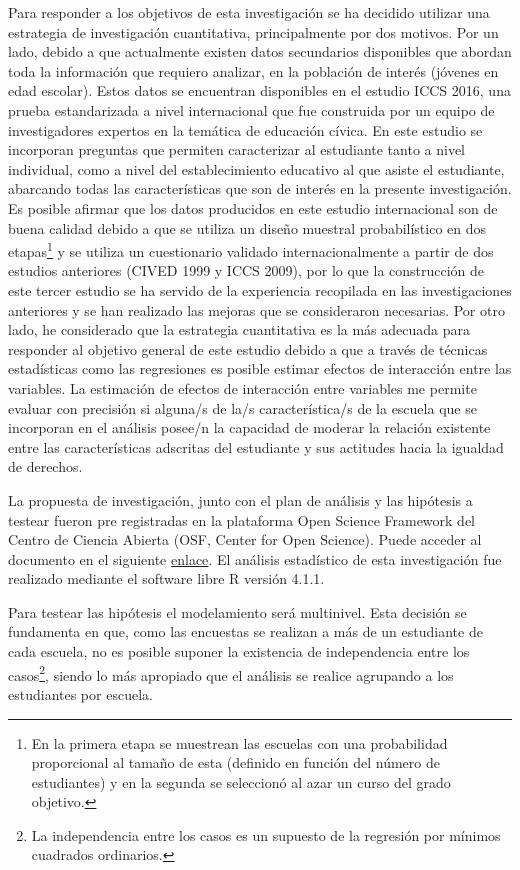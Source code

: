 \documentclass[12pt,twoside]{templates/facsothesis}
\begin{document}
Para responder a los objetivos de esta investigación se ha decidido utilizar una estrategia de investigación cuantitativa, principalmente por dos motivos. Por un lado, debido a que actualmente existen datos secundarios disponibles que abordan toda la información que requiero analizar, en la población de interés (jóvenes en edad escolar). Estos datos se encuentran disponibles en el estudio ICCS 2016, una prueba estandarizada a nivel internacional que fue construida por un equipo de investigadores expertos en la temática de educación cívica. En este estudio se incorporan preguntas que permiten caracterizar al estudiante tanto a nivel individual, como a nivel del establecimiento educativo al que asiste el estudiante, abarcando todas las características que son de interés en la presente investigación. Es posible afirmar que los datos producidos en este estudio internacional son de buena calidad debido a que se utiliza un diseño muestral probabilístico en dos etapas\footnote{En la primera etapa se muestrean las escuelas con una probabilidad proporcional al tamaño de esta (definido en función del número de estudiantes) y en la segunda se seleccionó al azar un curso del grado objetivo.} y se utiliza un cuestionario validado internacionalmente a partir de dos estudios anteriores (CIVED 1999 y ICCS 2009), por lo que la construcción de este tercer estudio se ha servido de la experiencia recopilada en las investigaciones anteriores y se han realizado las mejoras que se consideraron necesarias. Por otro lado, he considerado que la estrategia cuantitativa es la más adecuada para responder al objetivo general de este estudio debido a que a través de técnicas estadísticas como las regresiones es posible estimar efectos de interacción entre las variables. La estimación de efectos de interacción entre variables me permite evaluar con precisión si alguna/s de la/s característica/s de la escuela que se incorporan en el análisis posee/n la capacidad de moderar la relación existente entre las características adscritas del estudiante y sus actitudes hacia la igualdad de derechos.

La propuesta de investigación, junto con el plan de análisis y las hipótesis a testear fueron pre registradas en la plataforma Open Science Framework del Centro de Ciencia Abierta (OSF, Center for Open Science). Puede acceder al documento en el siguiente \href{https://osf.io/e6nza/}{enlace}. El análisis estadístico de esta investigación fue realizado mediante el software libre R versión 4.1.1.

Para testear las hipótesis el modelamiento será multinivel. Esta decisión se fundamenta en que, como las encuestas se realizan a más de un estudiante de cada escuela, no es posible suponer la existencia de independencia entre los casos\footnote{La independencia entre los casos es un supuesto de la regresión por mínimos cuadrados ordinarios.}, siendo lo más apropiado que el análisis se realice agrupando a los estudiantes por escuela.
\end{document}
